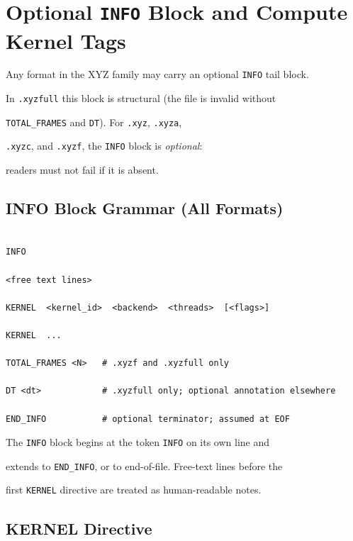 \documentclass[12pt, a4paper, oneside]{article}
\begin{document}

\section{Optional \texttt{INFO} Block and Compute Kernel Tags}

\label{sec:info_kernels}



Any format in the XYZ family may carry an optional \texttt{INFO} tail block.

In \texttt{.xyzfull} this block is structural (the file is invalid without

\texttt{TOTAL\_FRAMES} and \texttt{DT}).  For \texttt{.xyz}, \texttt{.xyza},

\texttt{.xyzc}, and \texttt{.xyzf}, the \texttt{INFO} block is \emph{optional}:

readers must not fail if it is absent.


\subsection{INFO Block Grammar (All Formats)}


\begin{lstlisting}[language={},frame=single]

INFO

<free text lines>

KERNEL  <kernel_id>  <backend>  <threads>  [<flags>]

KERNEL  ...

TOTAL_FRAMES <N>   # .xyzf and .xyzfull only

DT <dt>            # .xyzfull only; optional annotation elsewhere

END_INFO           # optional terminator; assumed at EOF

\end{lstlisting}


The \texttt{INFO} block begins at the token \texttt{INFO} on its own line and

extends to \texttt{END\_INFO}, or to end-of-file.  Free-text lines before the

first \texttt{KERNEL} directive are treated as human-readable notes.


\subsection{KERNEL Directive}
\end{document}

